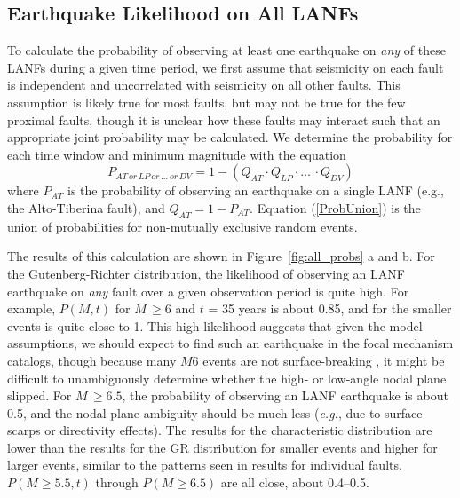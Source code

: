 \documentclass[draft,grl]{AGUTeX}
\begin{document}
\begin{article}
\subsection{Earthquake Likelihood on All LANFs}
To calculate the probability of observing at least one earthquake on \emph{any}
of these LANFs during a given time period, we first assume that seismicity on
each fault is independent and uncorrelated with seismicity on all other faults.
This assumption is likely true for most faults, but may not be true for the few
proximal faults, though it is unclear how these faults may interact such that
an appropriate joint probability may be calculated.  We determine the
probability for each time window and minimum magnitude with the equation
\begin{equation}
P_{AT \, or \, LP\, or\, \ldots \, or \, DV} = 1 - (Q_{AT} \cdot Q_{LP} \cdot \ldots \, \cdot Q_{DV})
\label{ProbUnion}
\end{equation}
where $P_{AT}$ is the probability of observing an earthquake on a single LANF
(e.g., the Alto-Tiberina fault), and $Q_{AT} = 1 - P_{AT}$. Equation
(\ref{ProbUnion}) is the union of probabilities for non-mutually exclusive
random events.

The results of this calculation are shown in Figure~\ref{fig:all_probs} a and b.
For the Gutenberg-Richter distribution, the likelihood of observing an LANF
earthquake on \emph{any} fault over a given observation period is quite high.
For example, $P(M,t)$ for $M \, \ge 6$ and $t$ = 35 years is about 0.85, and
for the smaller events is quite close to 1.  This high likelihood suggests that
given the model assumptions, we should expect to find such an earthquake in the
focal mechanism catalogs, though because many $M6$ events are not
surface-breaking \citep{hecker2013eqdist}, it might be difficult to
unambiguously determine whether the high- or low-angle nodal plane slipped.
For $M \, \ge 6.5$, the probability of observing an LANF earthquake is about
0.5, and the nodal plane ambiguity should be much less ({\it e.g.}, due to
surface scarps or directivity effects).  The results for the characteristic
distribution are lower than the results for the GR distribution for smaller
events and higher for larger events, similar to the patterns seen in results
for individual faults. $P(M\ge5.5,t)$ through $P(M\ge6.5)$ are all close, about
0.4--0.5.



\end{article}
\end{document}
